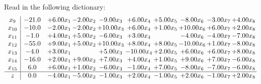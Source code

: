 \documentclass[9pt]{article}
\begin{document}
Read in the following dictionary:
\[\begin{array}{c| c c@{\hskip 2pt} c@{\hskip 2pt} c@{\hskip 2pt} c@{\hskip 2pt} c@{\hskip 2pt} c@{\hskip 2pt} c@{\hskip 2pt} c@{\hskip 2pt} }
 x_{9}   &  -21.0 & +  6.00 x_{1} & -2.00 x_{2} & -9.00 x_{3} & +  6.00 x_{4} & +  5.00 x_{5} & -8.00 x_{6} & -3.00 x_{7} & +  4.00 x_{8}\\
 x_{10}   &  -10.0 & -2.00 x_{1} & -2.00 x_{2} & + 10.00 x_{3} & +  6.00 x_{4} & +  1.00 x_{5} & + 10.00 x_{6} & +  6.00 x_{7} & +  2.00 x_{8}\\
 x_{11}   &  -1.0 & +  4.00 x_{1} & +  5.00 x_{2} & -6.00 x_{3} & +  3.00 x_{4} &   & -4.00 x_{6} & -4.00 x_{7} & -7.00 x_{8}\\
 x_{12}   &  -55.0 & +  9.00 x_{1} & +  5.00 x_{2} & + 10.00 x_{3} & +  8.00 x_{4} & +  8.00 x_{5} & -10.00 x_{6} & +  1.00 x_{7} & -8.00 x_{8}\\
 x_{13}   &  -4.0 & +  3.00 x_{1} &   & +  5.00 x_{3} & -10.00 x_{4} & +  2.00 x_{5} & +  6.00 x_{6} & +  6.00 x_{7} & +  8.00 x_{8}\\
 x_{14}   &  -16.0 & +  2.00 x_{1} & +  9.00 x_{2} & +  7.00 x_{3} & +  4.00 x_{4} & +  1.00 x_{5} & +  9.00 x_{6} & +  7.00 x_{7} & -6.00 x_{8}\\
 x_{15}   &  6.0 & +  6.00 x_{1} & +  1.00 x_{2} & -6.00 x_{3} & -1.00 x_{4} & +  7.00 x_{5} & -8.00 x_{6} & -7.00 x_{7} & -6.00 x_{8}\\
\hline
z    &  0.0 & -4.00 x_{1} & -5.00 x_{2} & -1.00 x_{3} & +  2.00 x_{4} & -1.00 x_{5} & +  2.00 x_{6} & -1.00 x_{7} & +  2.00 x_{8}\\
\end{array}\]
\end{document}
